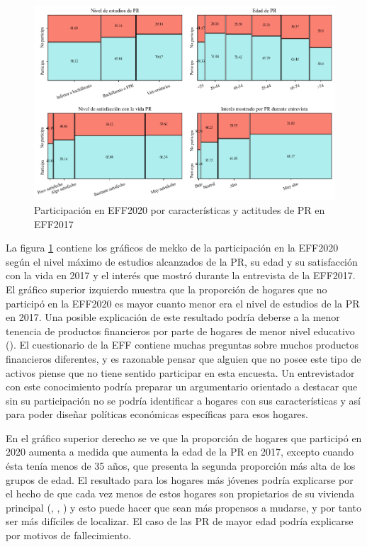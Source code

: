 \begin{figure}[ht]
	\centering
	\includegraphics[width=1\textwidth]{figs/figure2.png}
	\caption{Participación en EFF2020 por características y actitudes de PR en EFF2017}
	\label{fig:fig2}
\end{figure}

La figura \ref{fig:fig2} contiene los gráficos de mekko de la participación en la EFF2020 según el nivel máximo de estudios alcanzados de la PR, su edad y su satisfacción con la vida en 2017 y el interés que mostró durante la entrevista de la EFF2017. El gráfico superior izquierdo muestra que la proporción de hogares que no participó en la EFF2020 es mayor cuanto menor era el nivel de estudios de la PR en 2017. Una posible explicación de este resultado podría deberse a la menor tenencia de productos financieros por parte de hogares de menor nivel educativo (\cite{hospido2023encuesta}). El cuestionario de la EFF contiene muchas preguntas sobre muchos productos financieros diferentes, y es razonable pensar que alguien que no posee este tipo de activos piense que no tiene sentido participar en esta encuesta. Un entrevistador con este conocimiento podría preparar un argumentario orientado a destacar que sin su participación no se podría identificar a hogares con sus características y así para poder diseñar políticas económicas específicas para esos hogares.

En el gráfico superior derecho se ve que la proporción de hogares que participó en 2020 aumenta a medida que aumenta la edad de la PR en 2017, excepto cuando ésta tenía menos de 35 años, que presenta la segunda proporción más alta de los grupos de edad. El resultado para los hogares más jóvenes podría explicarse por el hecho de que cada vez menos de estos hogares son propietarios de su vivienda principal (\cite{eff2014results}, \cite{eff2017results}, \cite{eff2020results}) y esto puede hacer que sean más propensos a mudarse, y por tanto ser más difíciles de localizar. El caso de las PR de mayor edad podría explicarse por motivos de fallecimiento.

